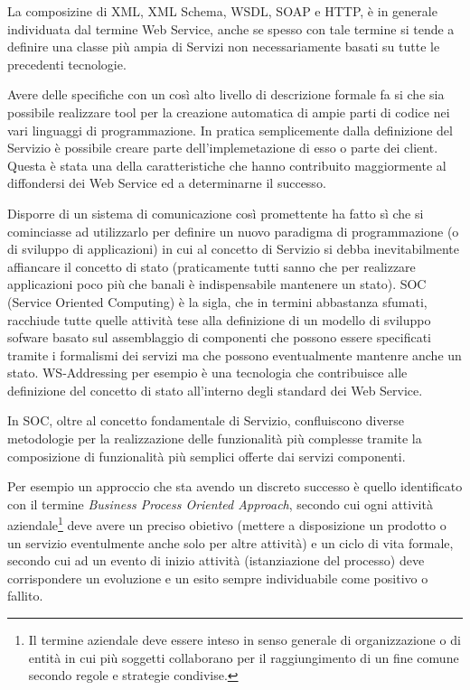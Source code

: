 La composizine di XML, XML Schema, WSDL, SOAP e HTTP, è in generale individuata
dal termine Web Service, anche se spesso con tale termine si tende a definire
una classe più ampia di Servizi non necessariamente basati su tutte le
precedenti tecnologie.

Avere delle specifiche con un così alto livello di descrizione formale fa si
che sia possibile realizzare tool per la creazione
automatica di ampie parti di codice nei vari linguaggi di programmazione. In
pratica semplicemente dalla definizione del Servizio è possibile creare parte
dell'implemetazione di esso o parte dei client. Questa è stata una della
caratteristiche che hanno contribuito maggiormente al diffondersi dei Web
Service ed a determinarne il successo.

Disporre di un sistema di comunicazione così promettente ha fatto sì che si
cominciasse ad utilizzarlo per definire un nuovo paradigma di programmazione (o di sviluppo di
applicazioni) in cui al concetto di Servizio si debba inevitabilmente affiancare
il concetto di stato (praticamente tutti sanno che per realizzare applicazioni
poco più che banali è indispensabile mantenere un stato). SOC (Service Oriented Computing) è
la sigla, che in termini abbastanza sfumati, racchiude tutte quelle attività
tese alla definizione di un modello di sviluppo sofware basato sul assemblaggio
di componenti che possono essere specificati tramite i formalismi
dei servizi ma che possono eventualmente mantenre anche un stato. WS-Addressing
per esempio è una tecnologia che contribuisce alle definizione del concetto di
stato all'interno degli standard dei Web Service. 


In SOC, oltre al concetto fondamentale di Servizio, confluiscono diverse
metodologie per la realizzazione delle funzionalità più complesse tramite la
composizione di funzionalità più semplici offerte dai servizi componenti.

Per esempio un approccio che sta avendo un discreto successo è quello
identificato con il termine \emph{Business Process Oriented Approach}, secondo
cui ogni attività aziendale\footnote{Il termine aziendale deve essere inteso in
senso generale di organizzazione o di entità in cui più soggetti collaborano per
il raggiungimento di un fine comune secondo regole e strategie condivise.} deve
avere un preciso obietivo (mettere a disposizione un prodotto o un servizio
eventulmente anche solo per altre attività) e un ciclo di vita formale, secondo
cui ad un evento di inizio attività (istanziazione del processo) deve
corrispondere un evoluzione e un esito sempre individuabile come positivo o
fallito.


